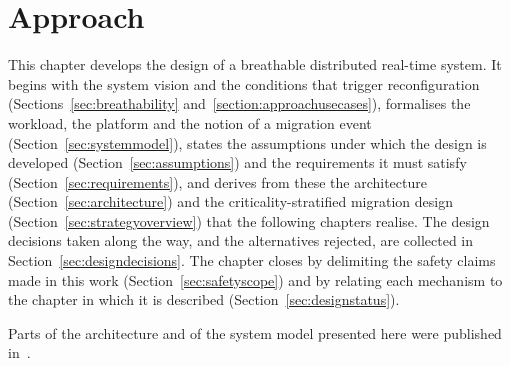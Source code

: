 %
%
%

\chapter{Approach}\label{chap:approach}

This chapter develops the design of a breathable distributed real-time system.
It begins with the system vision and the conditions that trigger reconfiguration
(Sections~\ref{sec:breathability} and~\ref{section:approachusecases}), formalises
the workload, the platform and the notion of a migration event
(Section~\ref{sec:systemmodel}), states the assumptions under which the design
is developed (Section~\ref{sec:assumptions}) and the requirements it must
satisfy (Section~\ref{sec:requirements}), and derives from these the
architecture (Section~\ref{sec:architecture}) and the criticality-stratified
migration design (Section~\ref{sec:strategyoverview}) that the following
chapters realise. The design decisions taken along the way, and the
alternatives rejected, are collected in Section~\ref{sec:designdecisions}. The
chapter closes by delimiting the safety claims made in this work
(Section~\ref{sec:safetyscope}) and by relating each mechanism to the chapter
in which it is described (Section~\ref{sec:designstatus}).

Parts of the architecture and of the system model presented here were published
in~\parencite{delgadillo_rage26}.

